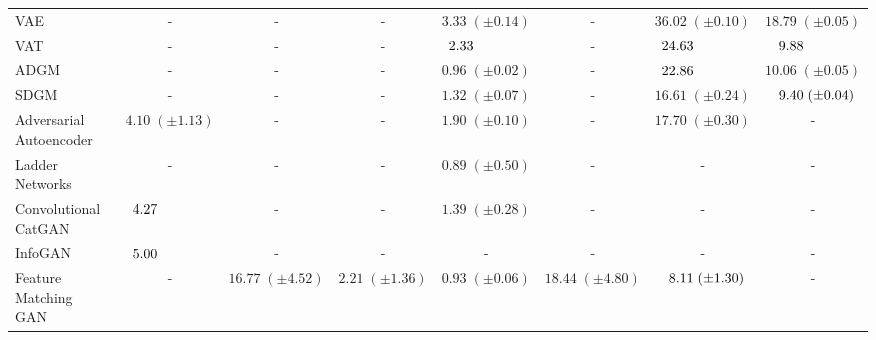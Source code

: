 \documentclass{article}
\begin{document}
\begin{center}
\begin{table}[t]
{\begin{tabular}{l|cccc|cc|c}
VAE~\citep{semi-vae}                            & -                   &-                  & -                 & $3.33\;(\pm 0.14)$  & -                               & $36.02\;(\pm 0.10)$               & $18.79\;(\pm 0.05)$              \\
VAT~\citep{vat}                                 & -                   &-                  & -                 & $2.33\hspace{3.6em}$& -                               & $24.63\hspace{3.6em}$             & $\hspace{.5em}9.88\hspace{3.6em}$\\
ADGM~\citep{adgm}                               & -                   &-                  & -                 & $0.96\;(\pm 0.02)$  & -                               & $22.86\hspace{3.6em}$             & $10.06\;(\pm 0.05)$              \\
SDGM~\citep{adgm}                               & -                   &-                  & -                 & $1.32\;(\pm 0.07)$  & -                               & $16.61\;(\pm 0.24)$               & $\hspace{.5em}9.40\;(\pm 0.04)$  \\
Adversarial Autoencoder~\citep{aae}             & $4.10\;(\pm 1.13)$  &-                  & -                 & $1.90\;(\pm 0.10)$  & -                               & $17.70\;(\pm 0.30)$               & -                                \\   
Ladder Networks~\citep{ladder}                  & -                   &-                  & -                 & $0.89\;(\pm 0.50)$  & -                               & -                                 & -                                \\  
Convolutional CatGAN~\citep{catgan}             & $4.27\hspace{3.6em}$&-                  & -                 & $1.39\;(\pm 0.28)$  & -                               & -                                 & -                                \\  
InfoGAN~\citep{infogan}                         & $5.00\hspace{3.6em}$&-                  & -                 & -                   & -                               & -                                 & -                                \\    
Feature Matching GAN~\citep{improved-gan}       & -                   &$16.77\;(\pm 4.52)$& $2.21\;(\pm 1.36)$& $0.93\;(\pm 0.06)$  & $18.44\;(\pm 4.80)$             & $\hspace{.5em}8.11\;(\pm 1.30)$   & -                                \\    

\end{tabular}}
\end{table}
\end{center}
\end{document}
